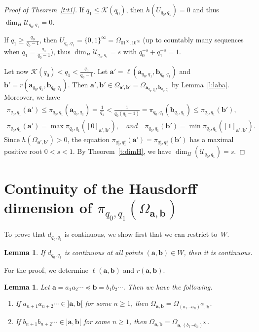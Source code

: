 \documentclass{amsart}
\newtheorem{lemma}[theorem]{Lemma}
\theoremstyle{definition}
\numberwithin{equation}{section}
\newcommand{\ba}{\mathbf{a}}
\newcommand{\bb}{\mathbf{b}}
\newcommand{\cK}{\mathcal{K}}
\newcommand{\cU}{\mathcal{U}}
\begin{document}
\begin{proof}[Proof of Theorem~\ref{t:t1}]
If $q_1 \le \cK(q_0)$, then $h(U_{q_0,q_1}) = 0$ and thus $\dim_H \cU_{q_0, q_1} = 0$.

If $q_1 \ge \frac{q_0}{q_0-1}$, then $U_{q_0,q_1} = \{0,1\}^\infty = \Omega_{01^\infty,10^\infty}$ (up to countably many sequences when $q_1 = \frac{q_0}{q_0-1}$), thus $\dim_H \cU_{q_0, q_1} = s$ with $q_0^{-s} + q_1^{-s} = 1$.

Let now $\cK(q_0) < q_1 < \frac{q_0}{q_0-1}$.
Let $\ba' = \ell(\ba_{q_0,q_1},\bb_{q_0,q_1})$ and $\bb' = r(\ba_{q_0,q_1},\bb_{q_0,q_1})$.
Then $\ba', \bb'  \in \Omega_{\ba',\bb'} = \Omega_{\ba_{q_0, q_1},\bb_{q_0, q_1}}$ by Lemma~\ref{l:laba}.
Moreover, we have 
\[
\begin{gathered}
\pi_{q_0,q_1}(\ba') \le \pi_{q_0,q_1}(\ba_{q_0, q_1}) = \tfrac{1}{q_1} < \tfrac{1}{q_0(q_1-1)} = \pi_{q_0,q_1}(\bb_{q_0, q_1}) \le \pi_{q_0,q_1}(\bb'), \\
\pi_{q_0,q_1}(\ba') = \max \pi_{q_0,q_1}([0]_{\ba',\bb'}), \quad and \quad \pi_{q_0,q_1}(\bb') = \min \pi_{q_0,q_1}([1]_{\ba',\bb'}).
\end{gathered}
\]
Since $h(\Omega_{\ba',\bb'}) > 0$, the equation $\pi_{q_0^s,q_1^s}(\ba') = \pi_{q_0^s,q_1^s}(\bb')$ has a maximal positive root $0 < s < 1$.
By Theorem~\ref{t:dimH}, we have $\dim_H(\cU_{q_0, q_1}) = s$.
\end{proof}

\section{Continuity of the Hausdorff dimension of $\pi_{q_0,q_1}(\Omega_{\ba,\bb})$} \label{sec:hausd-dimens-cu_q_0}
To prove that $d_{q_0,q_1}$ is continuous, we show first that we can restrict to~$W$.

\begin{lemma} \label{l:abinOmega}
If $d_{q_0,q_1}$ is continuous at all points $(\ba,\bb) \in W$, then it is continuous.
\end{lemma}

For the proof, we determine $\ell(\ba,\bb)$ and $r(\ba,\bb)$.

\begin{lemma} \label{l:ab}
Let $\ba = a_1a_2\cdots \preceq\bb = b_1b_2\cdots$.
Then we have the following. 
\begin{enumerate}[\upshape (i)]
\itemsep.5ex
\item \label{i:ab1}
 If $a_{n+1}a_{n+2}\cdots \in{]\ba,\bb[}$ for some $n \ge 1$, then $\Omega_{\ba,\bb} = \Omega_{(a_1\cdots a_n)^\infty,\bb}$. 
\item \label{i:ab2}
If $b_{n+1}b_{n+2}\cdots \in {]\ba,\bb[}$ for some $n \ge 1$, then $\Omega_{\ba,\bb} = \Omega_{\ba,(b_1\cdots b_n)^\infty}$. 
\end{enumerate}
\end{lemma}
\end{document}
